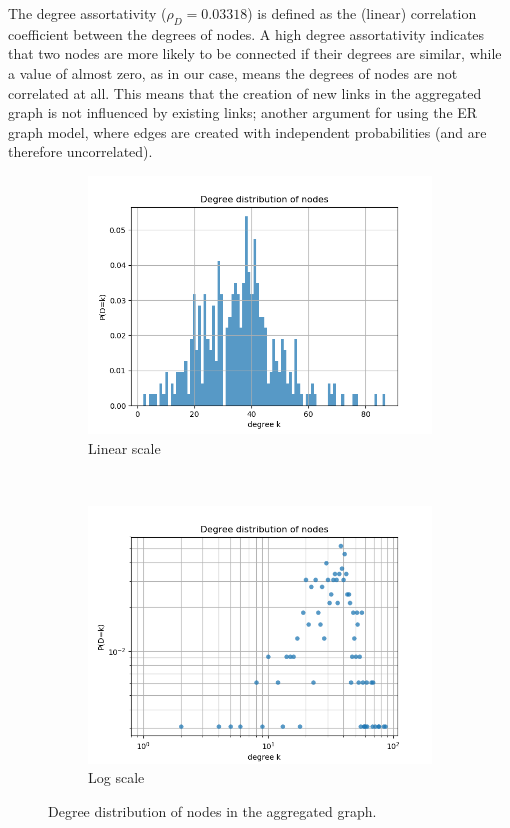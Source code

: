 \documentclass[letterpaper]{article}
\begin{document}
The degree assortativity (\(\rho_D=0.03318\)) is defined as the (linear) correlation coefficient between the degrees of nodes. A high degree assortativity indicates that two nodes are more likely to be connected if their degrees are similar, while a value of almost zero, as in our case, means the degrees of nodes are not correlated at all.  
This means that the creation of new links in the aggregated graph is not influenced by existing links; another argument for using the ER graph model, where edges are created with independent probabilities (and are therefore uncorrelated).

\begin{figure}
    \centering
    \begin{subfigure}[b]{0.49\textwidth}
        \includegraphics[width=\textwidth]{img/degree_distribution.png}
        \caption{Linear scale}
	    \label{fig:degree_distribution_linlin}
    \end{subfigure}
    ~ %
    \begin{subfigure}[b]{0.48\textwidth}
        \includegraphics[width=\textwidth]{img/degree_distribution_loglog.png}
        \caption{Log scale}
	    \label{fig:degree_distribution_loglog}
    \end{subfigure}
    \caption{Degree distribution of nodes in the aggregated graph.}
    \label{fig:degree_distribution_aggregated}
\end{figure}
\end{document}
